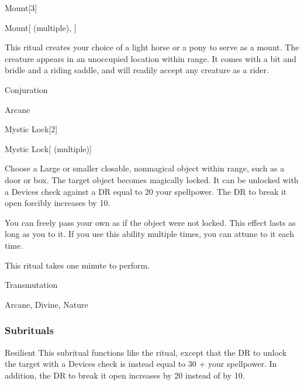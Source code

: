 \begin{spellsection}{Mount}[3]


\begin{ability}{Mount}[ (multiple), ]

This ritual creates your choice of a light horse or a pony to serve as a mount.
The creature appears in an unoccupied location within \rngclose range.
It comes with a bit and bridle and a riding saddle, and will readily accept any creature as a rider.

\end{ability}




 Conjuration

 Arcane
\end{spellsection}


\begin{spellsection}{Mystic Lock}[2]


\begin{ability}{Mystic Lock}[ (multiple)]

Choose a Large or smaller closable, nonmagical object within \rngclose range, such as a door or box.
The target object becomes magically locked.
It can be unlocked with a Devices check against a DR equal to 20 \add your spellpower.
The DR to break it open forcibly increases by 10.

You can freely pass your own  as if the object were not locked.
This effect lasts as long as you  to it.
If you use this ability multiple times, you can attune to it each time.

This ritual takes one minute to perform.

\end{ability}




 Transmutation

 Arcane, Divine, Nature
\end{spellsection}


\subsubsection{Subrituals}


\begin{ability}[\nth{5}]{Resilient}
This subritual functions like the  ritual, except that the DR to unlock the target with a Devices check is instead equal to 30 + your spellpower.
In addition, the DR to break it open increases by 20 instead of by 10.
\end{ability}
\vspace{0.25em}


